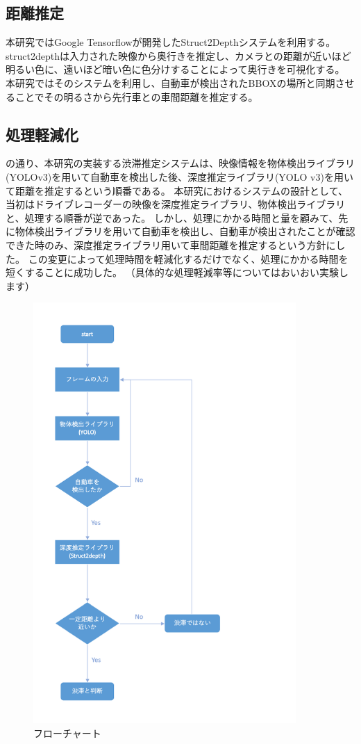 \subsection{距離推定}
本研究ではGoogle Tensorflowが開発したStruct2Depthシステムを利用する。
struct2depthは入力された映像から奥行きを推定し、カメラとの距離が近いほど明るい色に、遠いほど暗い色に色分けすることによって奥行きを可視化する。
本研究ではそのシステムを利用し、自動車が検出されたBBOXの場所と同期させることでその明るさから先行車との車間距離を推定する。

\subsection{処理軽減化}
の通り、本研究の実装する渋滞推定システムは、映像情報を物体検出ライブラリ(YOLOv3)を用いて自動車を検出した後、深度推定ライブラリ(YOLO v3)を用いて距離を推定するという順番である。
本研究におけるシステムの設計として、当初はドライブレコーダーの映像を深度推定ライブラリ、物体検出ライブラリと、処理する順番が逆であった。
しかし、処理にかかる時間と量を顧みて、先に物体検出ライブラリを用いて自動車を検出し、自動車が検出されたことが確認できた時のみ、深度推定ライブラリ用いて車間距離を推定するという方針にした。
この変更によって処理時間を軽減化するだけでなく、処理にかかる時間を短くすることに成功した。
（具体的な処理軽減率等についてはおいおい実験します）

\begin{figure}[htbp]
  \begin{center}
    \includegraphics[width=10cm]{figs/gp2_flowchart.png}
    \caption{フローチャート}
    \label{fig:system_flow}
  \end{center}
\end{figure}

